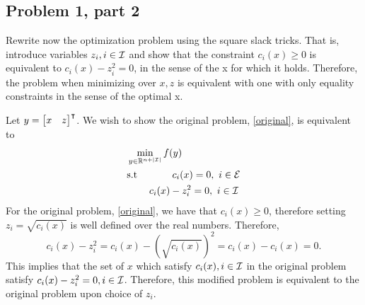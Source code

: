 \newpage
\subsection{Problem 1, part 2}
Rewrite now the optimization problem using the square slack tricks. That is, introduce variables $z_i, i \in \mathcal{I}$ and show that the constraint $c_i(x) \geq 0$ is equivalent to $c_i(x) - z_i^2 = 0$, in the sense of the x for which it holds. Therefore, the problem when minimizing over $x, z$ is equivalent with one with only equality constraints in the sense of the optimal x.
\partbreak
\begin{solution}

     Let $y = \mqty[x&z]\T$. We wish to show the original problem, \ref{original}, is equivalent to 
    \begin{align}
    &\min_{y \in \mathbb{R}^{n + |\mathcal{I}|}} f(y)\label{modified}\\ &\text{s.t} \hspace{9mm}\quad c_i(x) = 0, \ i \in \mathcal{E} \nonumber\\
    &\hspace{8mm} c_i(x) - z^2_i = 0, \ i \in \mathcal{I}\nonumber
\end{align}
For the original problem, \ref{original}, we have that $c_i(x) \geq 0$, therefore setting $z_i = \sqrt{c_i(x)}$ is well defined over the real numbers. Therefore, 
\[c_i(x) - z_i^2 = c_i(x) - \left(\sqrt{c_i(x)}\right )^2 = c_i(x) - c_i(x) = 0.\]
This implies that the set of $x$ which satisfy $c_i(x), i \in \mathcal{I}$ in the original problem satisfy $c_i (x) - z_i^2 = 0, i \in \mathcal{I}$. Therefore, this modified problem is equivalent to the original problem upon choice of $z_i$.
\end{solution}

\newpage
